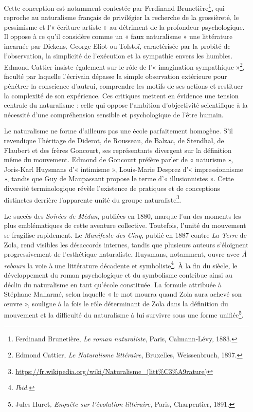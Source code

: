 Cette conception est notamment contestée par Ferdinand Brunetière\footnote{Ferdinand Brunetière, \textit{Le roman naturaliste}, Paris, Calmann-Lévy, 1883.}, qui reproche au naturalisme français de privilégier la recherche de la grossièreté, le pessimisme et l’« écriture artiste » au détriment de la profondeur psychologique. Il oppose à ce qu’il considère comme un « faux naturalisme » une littérature incarnée par Dickens, George Eliot ou Tolstoï, caractérisée par la probité de l’observation, la simplicité de l’exécution et la sympathie envers les humbles. Edmond Cattier insiste également sur le rôle de l’« imagination sympathique »\footnote{Edmond Cattier, \textit{Le Naturalisme littéraire}, Bruxelles, Weissenbruch, 1897.}, faculté par laquelle l’écrivain dépasse la simple observation extérieure pour pénétrer la conscience d’autrui, comprendre les motifs de ses actions et restituer la complexité de son expérience. Ces critiques mettent en évidence une tension centrale du naturalisme : celle qui oppose l’ambition d’objectivité scientifique à la nécessité d’une compréhension sensible et psychologique de l’être humain.

Le naturalisme ne forme d’ailleurs pas une école parfaitement homogène. S’il revendique l’héritage de Diderot, de Rousseau, de Balzac, de Stendhal, de Flaubert et des frères Goncourt, ses représentants divergent sur la définition même du mouvement. Edmond de Goncourt préfère parler de « naturisme », Joris-Karl Huysmans d’« intimisme », Louis-Marie Desprez d’« impressionnisme », tandis que Guy de Maupassant propose le terme d’« illusionnistes ». Cette diversité terminologique révèle l’existence de pratiques et de conceptions distinctes derrière l’apparente unité du groupe naturaliste\footnote{\url{https://fr.wikipedia.org/wiki/Naturalisme_(litt\%C3\%A9rature)}}.

Le succès des \textit{Soirées de Médan}, publiées en 1880, marque l’un des moments les plus emblématiques de cette aventure collective. Toutefois, l’unité du mouvement se fragilise rapidement. Le \textit{Manifeste des Cinq}, publié en 1887 contre \textit{La Terre} de Zola, rend visibles les désaccords internes, tandis que plusieurs auteurs s’éloignent progressivement de l’esthétique naturaliste. Huysmans, notamment, ouvre avec \textit{À rebours} la voie à une littérature décadente et symboliste\footnote{\textit{Ibid.}}. À la fin du siècle, le développement du roman psychologique et du symbolisme contribue ainsi au déclin du naturalisme en tant qu’école constituée. La formule attribuée à Stéphane Mallarmé, selon laquelle « le mot mourra quand Zola aura achevé son œuvre », souligne à la fois le rôle déterminant de Zola dans la définition du mouvement et la difficulté du naturalisme à lui survivre sous une forme unifiée\footnote{Jules Huret, \textit{Enquête sur l'évolution littéraire}, Paris, Charpentier, 1891.}.

